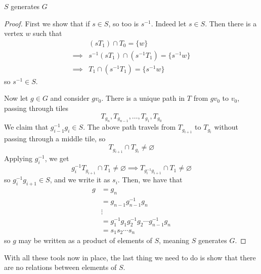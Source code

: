 \begin{lemma}\label{S Generates G}
    $S$ generates $G$
\end{lemma}

\begin{proof}
    First we show that if $s \in S$, so too is $s^{-1}$. Indeed let $s \in S$. Then there is a vertex $w$ such that 
    \begin{align*}
        & (sT_1) \cap T_0 = \{w\} \\
        \implies & s^{-1}(sT_1) \cap (s^{-1}T_1) = \{s^{-1}w\} \\
        \implies & T_1 \cap (s^{-1}T_1) = \{s^{-1}w\}
    \end{align*}
    so $s^{-1} \in S$. 

    Now let $g \in G$ and consider $gv_0$. There is a unique path in $T$ from $gv_0$ to $v_0$, passing through tiles 
    \[T_{g_n}, T_{g_{n-1}}, \ldots, T_{g_1}, T_{g_0}\]
    We claim that $g_{i-1}^{-1}g_i\in S$. The above path travels from $T_{g_{i+1}}$ to $T_{g_i}$ without passing through a middle tile, so 
    \[T_{g_{i+1}} \cap T_{g_i} \neq \varnothing\]
    Applying $g_i^{-1}$, we get 
    \[g_i^{-1}T_{g_{i+1}} \cap T_1 \neq \varnothing \implies T_{g_i^{-1}g_{i+1}} \cap T_1 \neq \varnothing\]
    so $g_i^{-1}g_{i+1} \in S$, and we write it as $s_i$. Then, we have that 
    \begin{align*}
        g & = g_n \\
          & = g_{n-1}g_{n-1}^{-1}g_n \\
          & \vdots \\
          & = g_1^{-1}g_1g_2^{-1}g_2\cdots g_{n-1}^{-1}g_n \\
          & = s_1s_2 \cdots s_n
    \end{align*}
    so $g$ may be written as a product of elements of $S$, meaning $S$ generates $G$.
\end{proof}

With all these tools now in place, the last thing we need to do is show that there are no relations between elements of $S$. 

